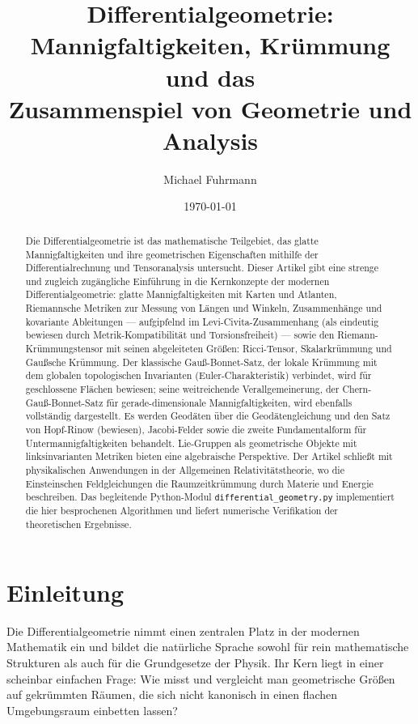 \documentclass[12pt,a4paper]{amsart}
\author{Michael Fuhrmann}
\date{\today}
\theoremstyle{definition}
\begin{document}
\title{Differentialgeometrie: Mannigfaltigkeiten, Kr\"ummung und das\\
Zusammenspiel von Geometrie und Analysis}

\begin{abstract}
Die Differentialgeometrie ist das mathematische Teilgebiet, das glatte
Mannigfaltigkeiten und ihre geometrischen Eigenschaften mithilfe der
Differentialrechnung und Tensoranalysis untersucht. Dieser Artikel gibt
eine strenge und zugleich zugängliche Einführung in die Kernkonzepte
der modernen Differentialgeometrie: glatte Mannigfaltigkeiten mit Karten
und Atlanten, Riemannsche Metriken zur Messung von Längen und Winkeln,
Zusammenhänge und kovariante Ableitungen --- aufgipfelnd im
Levi-Civita-Zusammenhang (als eindeutig bewiesen durch Metrik-Kompatibilität
und Torsionsfreiheit) --- sowie den Riemann-Krümmungstensor mit seinen
abgeleiteten Größen: Ricci-Tensor, Skalarkrümmung und Gaußsche Krümmung.
Der klassische Gauß-Bonnet-Satz, der lokale Krümmung mit dem globalen
topologischen Invarianten (Euler-Charakteristik) verbindet, wird für
geschlossene Flächen bewiesen; seine weitreichende Verallgemeinerung, der
Chern-Gauß-Bonnet-Satz für gerade-dimensionale Mannigfaltigkeiten, wird
ebenfalls vollständig dargestellt. Es werden Geodäten über die Geodätengleichung
und den Satz von Hopf-Rinow (bewiesen), Jacobi-Felder sowie die zweite
Fundamentalform für Untermannigfaltigkeiten behandelt. Lie-Gruppen als
geometrische Objekte mit linksinvarianten Metriken bieten eine algebraische
Perspektive. Der Artikel schließt mit physikalischen Anwendungen in der
Allgemeinen Relativitätstheorie, wo die Einsteinschen Feldgleichungen
die Raumzeitkrümmung durch Materie und Energie beschreiben. Das begleitende
Python-Modul \texttt{differential\_geometry.py} implementiert die hier
besprochenen Algorithmen und liefert numerische Verifikation der theoretischen
Ergebnisse.
\end{abstract}

\maketitle
\tableofcontents

\section{Einleitung}

Die Differentialgeometrie nimmt einen zentralen Platz in der modernen Mathematik
ein und bildet die natürliche Sprache sowohl für rein mathematische Strukturen
als auch für die Grundgesetze der Physik. Ihr Kern liegt in einer scheinbar
einfachen Frage: Wie misst und vergleicht man geometrische Größen auf gekrümmten
Räumen, die sich nicht kanonisch in einen flachen Umgebungsraum einbetten lassen?
\end{document}
